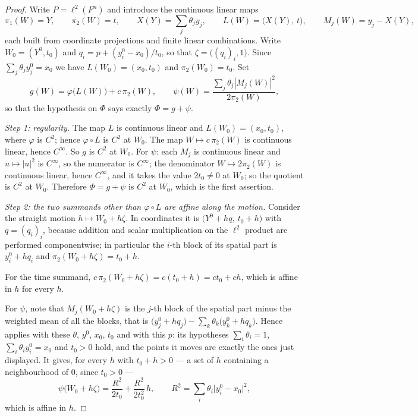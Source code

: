 \begin{proof}
Write $P=\ell^2(F^n)$ and introduce the continuous linear maps
\[
  \pi_1(W)=Y,\qquad \pi_2(W)=t,\qquad X(Y)=\sum_j\theta_jy_j,\qquad
  L(W)=\bigl(X(Y),\,t\bigr),\qquad M_j(W)=y_j-X(Y),
\]
each built from coordinate projections and finite linear combinations. Write
$W_0=(Y^0,t_0)$ and $q_i=p+(y^0_i-x_0)/t_0$, so that $\zeta=\bigl((q_i)_i,1\bigr)$. Since
$\sum_j\theta_jy^0_j=x_0$ we have $L(W_0)=(x_0,t_0)$ and $\pi_2(W_0)=t_0$. Set
\[
  g(W)=\varphi\bigl(L(W)\bigr)+c\,\pi_2(W),\qquad
  \psi(W)=\frac{\sum_j\theta_j|M_j(W)|^2}{2\pi_2(W)},
\]
so that the hypothesis on $\Phi$ says exactly $\Phi=g+\psi$.

\emph{Step 1: regularity.}
The map $L$ is continuous linear and $L(W_0)=(x_0,t_0)$, where $\varphi$ is $C^2$; hence
$\varphi\circ L$ is $C^2$ at $W_0$. The map $W\mapsto c\,\pi_2(W)$ is continuous linear,
hence $C^\infty$. So $g$ is $C^2$ at $W_0$. For $\psi$: each $M_j$ is continuous linear
and $u\mapsto|u|^2$ is $C^\infty$, so the numerator is $C^\infty$; the denominator
$W\mapsto2\pi_2(W)$ is continuous linear, hence $C^\infty$, and it takes the value
$2t_0\neq0$ at $W_0$; so the quotient is $C^2$ at $W_0$. Therefore $\Phi=g+\psi$ is $C^2$
at $W_0$, which is the first assertion.

\emph{Step 2: the two summands other than $\varphi\circ L$ are affine along the motion.}
Consider the straight motion $h\mapsto W_0+h\zeta$. In coordinates it is
$\bigl(Y^0+hq,\ t_0+h\bigr)$ with $q=(q_i)_i$, because addition and scalar
multiplication on the $\ell^2$ product are performed componentwise; in particular the
$i$-th block of its spatial part is $y^0_i+hq_i$ and $\pi_2(W_0+h\zeta)=t_0+h$.

For the time summand, $c\,\pi_2(W_0+h\zeta)=c(t_0+h)=ct_0+ch$, which is affine in $h$
for every $h$.

For $\psi$, note that $M_j(W_0+h\zeta)$ is the $j$-th block of the spatial part minus
the weighted mean of all the blocks, that is
$\bigl(y^0_j+hq_j\bigr)-\sum_k\theta_k\bigl(y^0_k+hq_k\bigr)$. Hence
 applies with these $\theta$, $y^0$, $x_0$, $t_0$
and with this $p$: its hypotheses $\sum_i\theta_i=1$, $\sum_i\theta_iy^0_i=x_0$ and
$t_0>0$ hold, and the points it moves are exactly the ones just displayed. It gives,
for every $h$ with $t_0+h>0$ --- a set of $h$ containing a neighbourhood of $0$, since
$t_0>0$ ---
\[
  \psi\bigl(W_0+h\zeta\bigr)
    =\frac{R^2}{2t_0}+\frac{R^2}{2t_0^2}\,h,
  \qquad R^2=\sum_i\theta_i\bigl|y^0_i-x_0\bigr|^2 ,
\]
which is affine in $h$.


\end{proof}
